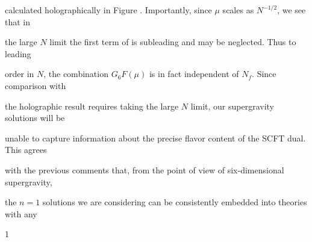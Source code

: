 \documentclass[a4paper,12pt]{article}
\begin{document}
calculated holographically in Figure . Importantly, since $\mu$ scales as $N^{-1/2}$, we see that in

the large $N$ limit the first term of is subleading and may be neglected. Thus to leading

order in $N$, the combination $G_{6}F(\mu)$ is in fact independent of $N_{f}$. Since comparison with

the holographic result requires taking the large $N$ limit, our supergravity solutions will be

unable to capture information about the precise flavor content of the SCFT dual. This agrees

with the previous comments that, from the point of view of six-dimensional supergravity,

the $n=1$ solutions we are considering can be consistently embedded into theories with any

1
\end{document}
